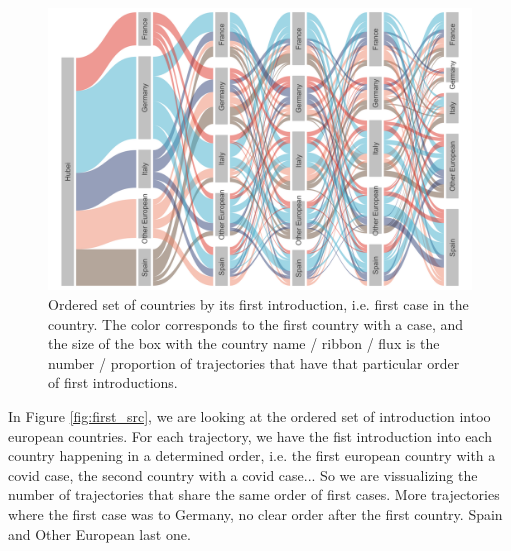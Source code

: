 \documentclass[12pt,]{article}
\begin{document}
\begin{figure}[ht]
    \centering
    \includegraphics[width=\textwidth]{201014_europe2_figtraj04.png}
    \caption{Ordered set of countries by its first introduction, i.e. first case in the country. The color corresponds to the first country with a case, and the size of the box with the country name / ribbon / flux is the number / proportion of trajectories that have that particular order of first introductions.} 
    \label{fig:first_dest}
\end{figure}

In Figure \ref{fig:first_src}, we are looking at the ordered set of introduction intoo european countries. For each trajectory, we have the fist introduction into each country happening in a determined order, i.e. the first european country with a covid case, the second country with a covid case... So we are vissualizing the number of trajectories that share the same order of first cases. More trajectories where the first case was to Germany, no clear order after the first country. Spain and Other European last one.\\
\end{document}
